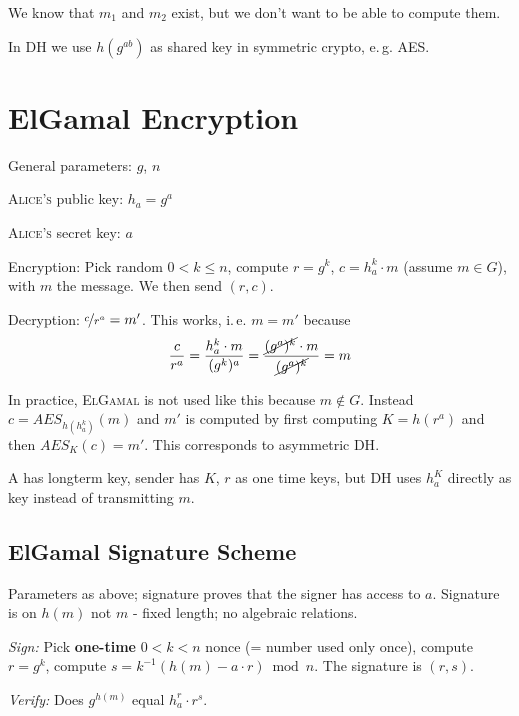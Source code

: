 \begin{remark}
We know that $m_1$ and $m_2$ exist, but we don't want to be able to compute them.
\end{remark}

In \textsc{DH} we use $h(g^{ab})$ as shared key in symmetric crypto, e.\,g. \textsc{AES}.

\section{ElGamal Encryption}

General parameters: $g$, $n$

\textsc{Alice's} public key: $h_a = g^a$

\textsc{Alice's} secret key: $a$

Encryption: Pick random $0<k \leq n$, compute $r=g^k$, $c=h_a^k \cdot m$ (assume $m \in G$), with $m$ the message. We then send $(r,c)$.

Decryption: $\nicefrac{c}{r^a} = m'$. This works, i.\,e. $m=m'$ because
\[
	\frac{c}{r^a} = \frac{h_a^k \cdot m}{(g^k)^a} = \frac{\cancel{(g^a)^k} \cdot m}{\cancel{(g^a)^k}} = m
\]

In practice, \textsc{ElGamal} is not used like this because $m \not \in G$. Instead $c= AES_{h(h_a^k)}(m)$ and $m'$ is computed by first computing $K = h(r^a)$ and then $AES_K(c) = m'$. This corresponds to asymmetric \textsc{DH}.

\textsc{A} has longterm key, sender has $K$, $r$ as one time keys, but \textsc{DH} uses $h_a^K$ directly as key instead of transmitting $m$.

\subsection{ElGamal Signature Scheme}

Parameters as above; signature proves that the signer has access to $a$. Signature is on $h(m)$ not $m$ - fixed length; no algebraic relations.

\emph{Sign:} Pick \textbf{one-time} $0<k<n$ nonce (= number used only once), compute $r=g^k$, compute $s=k^{-1}(h(m) - a \cdot r) \bmod n$. The signature is $(r,s)$.

\emph{Verify:} Does $g^{h(m)}$ equal $h_a^r \cdot r^s$.